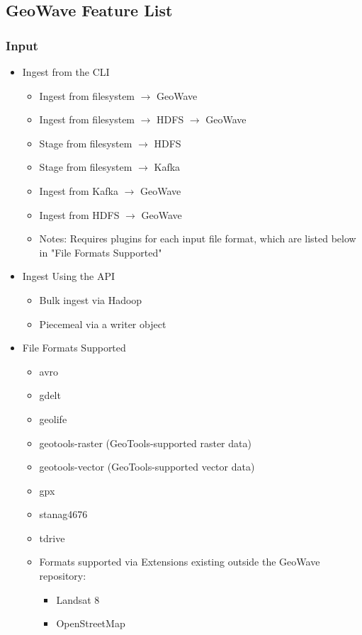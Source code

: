 \subsection{GeoWave Feature List}
\label{appendix:features:geowave}

\subsubsection*{Input}

\begin{itemize}
\item{
  Ingest from the CLI
  \begin{itemize}
  \item Ingest from filesystem $\rightarrow$ GeoWave
  \item Ingest from filesystem $\rightarrow$ HDFS $\rightarrow$ GeoWave
  \item Stage from filesystem $\rightarrow$ HDFS
  \item Stage from filesystem $\rightarrow$ Kafka
  \item Ingest from Kafka $\rightarrow$ GeoWave
  \item Ingest from HDFS $\rightarrow$ GeoWave
  \item Notes: Requires plugins for each input file format, which are listed below in "File Formats Supported"
  \end{itemize}
}
\item{
  Ingest Using the API
  \begin{itemize}
  \item Bulk ingest via Hadoop
  \item Piecemeal via a writer object
  \end{itemize}
}
\item{
  File Formats Supported
  \begin{itemize}
  \item avro
  \item gdelt
  \item geolife
  \item geotools-raster (GeoTools-supported raster data)
  \item geotools-vector (GeoTools-supported vector data)
  \item gpx
  \item stanag4676
  \item tdrive
  \item{
    Formats supported via Extensions existing outside the GeoWave repository:
    \begin{itemize}
    \item Landsat 8
    \item OpenStreetMap
    \end{itemize}
  }
  \end{itemize}
}
\end{itemize}


